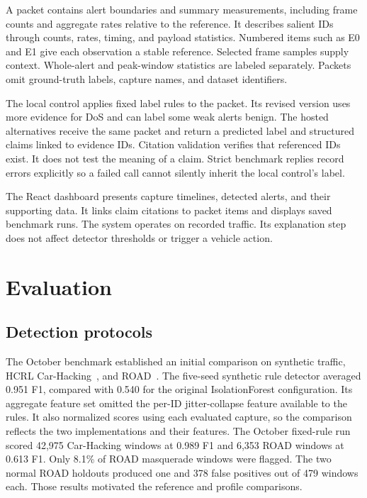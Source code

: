 \documentclass[sigconf,pbalance=true]{acmart}
\begin{document}
A packet contains alert boundaries and summary measurements, including frame counts and aggregate rates relative to the reference. It describes salient IDs through counts, rates, timing, and payload statistics. Numbered items such as E0 and E1 give each observation a stable reference. Selected frame samples supply context. Whole-alert and peak-window statistics are labeled separately. Packets omit ground-truth labels, capture names, and dataset identifiers.

The local control applies fixed label rules to the packet. Its revised version uses more evidence for DoS and can label some weak alerts benign. The hosted alternatives receive the same packet and return a predicted label and structured claims linked to evidence IDs. Citation validation verifies that referenced IDs exist. It does not test the meaning of a claim. Strict benchmark replies record errors explicitly so a failed call cannot silently inherit the local control's label.

The React dashboard presents capture timelines, detected alerts, and their supporting data. It links claim citations to packet items and displays saved benchmark runs. The system operates on recorded traffic. Its explanation step does not affect detector thresholds or trigger a vehicle action.

\section{Evaluation}

\subsection{Detection protocols}

The October benchmark established an initial comparison on synthetic traffic, HCRL Car-Hacking~\cite{song2020carhacking}, and ROAD~\cite{verma2024road}. The five-seed synthetic rule detector averaged 0.951 F1, compared with 0.540 for the original IsolationForest configuration. Its aggregate feature set omitted the per-ID jitter-collapse feature available to the rules. It also normalized scores using each evaluated capture, so the comparison reflects the two implementations and their features. The October fixed-rule run scored 42,975 Car-Hacking windows at 0.989 F1 and 6,353 ROAD windows at 0.613 F1. Only 8.1\% of ROAD masquerade windows were flagged. The two normal ROAD holdouts produced one and 378 false positives out of 479 windows each. Those results motivated the reference and profile comparisons.
\end{document}
